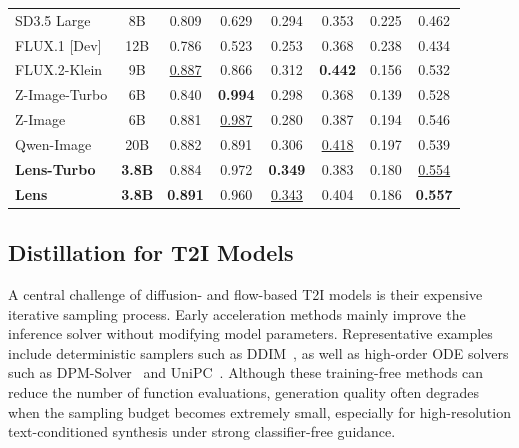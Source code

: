 \begin{table}[t]
{\begin{tabular}{l|c|cccccc}
    SD3.5 Large & 8B
      & 0.809 & 0.629 & 0.294 & 0.353 & 0.225 & 0.462 \\
    FLUX.1 [Dev] & 12B
      & 0.786 & 0.523 & 0.253 & 0.368 & 0.238 & 0.434 \\
    FLUX.2-Klein & 9B
      & \underline{0.887} & 0.866 & 0.312 & \textbf{0.442} & 0.156 & 0.532 \\
    Z-Image-Turbo & 6B
      & 0.840 & \textbf{0.994} & 0.298 & 0.368 & 0.139 & 0.528 \\
    Z-Image & 6B
      & 0.881 & \underline{0.987} & 0.280 & 0.387 & 0.194 & 0.546 \\
    Qwen-Image & 20B
      & 0.882 & 0.891 & 0.306 & \underline{0.418} & 0.197 & 0.539 \\
    \midrule
    \textbf{Lens-Turbo} & \textbf{3.8B}
      & 0.884 & 0.972 & \textbf{0.349} & 0.383 & 0.180 & \underline{0.554} \\
    \textbf{Lens} & \textbf{3.8B}
      & \textbf{0.891} & 0.960 & \underline{0.343} & 0.404 & 0.186 & \textbf{0.557} \\
    \bottomrule
  \end{tabular}%
  }
\end{table}

\subsection{Distillation for T2I Models}

A central challenge of diffusion- and flow-based T2I models is their expensive iterative sampling process. Early acceleration methods mainly improve the inference solver without modifying model parameters. Representative examples include deterministic samplers such as DDIM~\citep{ddim}, as well as high-order ODE solvers such as DPM-Solver~\citep{dpmsolver} and UniPC~\citep{unipc}. Although these training-free methods can reduce the number of function evaluations, generation quality often degrades when the sampling budget becomes extremely small, especially for high-resolution text-conditioned synthesis under strong classifier-free guidance.


